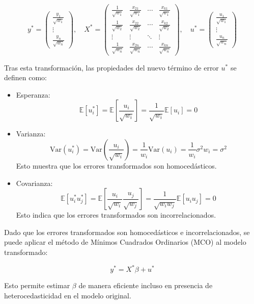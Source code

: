 \documentclass[a4paper,12pt]{article}
\begin{document}
\[
y^* =
\begin{pmatrix}
\frac{y_1}{\sqrt{w_1}} \\
\vdots \\
\frac{y_n}{\sqrt{w_n}}
\end{pmatrix},
\quad
X^* =
\begin{pmatrix}
\frac{1}{\sqrt{w_1}} & \frac{x_{21}}{\sqrt{w_1}} & \cdots & \frac{x_{k1}}{\sqrt{w_1}} \\
\frac{1}{\sqrt{w_2}} & \frac{x_{22}}{\sqrt{w_2}} & \cdots & \frac{x_{k2}}{\sqrt{w_2}} \\
\vdots & \vdots & \ddots & \vdots \\
\frac{1}{\sqrt{w_n}} & \frac{x_{2n}}{\sqrt{w_n}} & \cdots & \frac{x_{kn}}{\sqrt{w_n}}
\end{pmatrix},
\quad
u^* =
\begin{pmatrix}
\frac{u_1}{\sqrt{w_1}} \\
\vdots \\
\frac{u_n}{\sqrt{w_n}}
\end{pmatrix}
\]

Tras esta transformación, las propiedades del nuevo término de error $u^*$ se definen como:

\begin{itemize}
    \item Esperanza: 
    \[
    \mathbb{E}[u^*_i] = \mathbb{E}\left[\frac{u_i}{\sqrt{w_i}}\right] = \frac{1}{\sqrt{w_i}} \mathbb{E}[u_i] = 0
    \]
    \item Varianza:
    \[
    \text{Var}(u^*_i) = \text{Var}\left(\frac{u_i}{\sqrt{w_i}}\right) = \frac{1}{w_i} \text{Var}(u_i) = \frac{1}{w_i} \sigma^2 w_i = \sigma^2
    \]
    Esto muestra que los errores transformados son homocedásticos.
    \item Covarianza:
    \[
    \mathbb{E}[u^*_i u^*_j] = \mathbb{E}\left[\frac{u_i}{\sqrt{w_i}} \frac{u_j}{\sqrt{w_j}}\right] = \frac{1}{\sqrt{w_i w_j}} \mathbb{E}[u_i u_j] = 0
    \]
    Esto indica que los errores transformados son incorrelacionados.
\end{itemize}

Dado que los errores transformados son homocedásticos e incorrelacionados, se puede aplicar el método de Mínimos Cuadrados Ordinarios (MCO) al modelo transformado:

\[
y^* = X^* \beta + u^*
\]

Esto permite estimar $\beta$ de manera eficiente incluso en presencia de heterocedasticidad en el modelo original.
\end{document}
